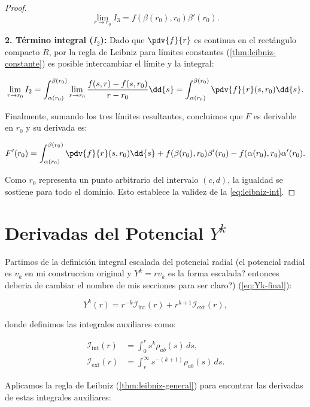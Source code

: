 \begin{proof}
  \[ \lim_{r\to r_0} I_3 = f(\beta(r_0),r_0)\beta'(r_0). \]

  \textbf{2. Término integral (\( I_2 \)):} Dado que \( \pdv{f}{r} \) es continua en el rectángulo compacto \( R \), por la regla de Leibniz para límites constantes (\cref{thm:leibniz-constante}) es posible intercambiar el límite y la integral:

  \[ \lim_{r \to r_0} I_2 = \int_{\alpha(r_0)}^{\beta(r_0)} \lim_{r\to r_0} \frac{f(s,r) - f(s,r_0)}{r-r_0} \dd{s} = \int_{\alpha(r_0)}^{\beta(r_0)} \pdv{f}{r}(s,r_0) \dd{s}. \]

  Finalmente, sumando los tres límites resultantes, concluimos que \( F \) es derivable en \( r_0 \) y su derivada es:

  \[ F'(r_0) = \int_{\alpha(r_0)}^{\beta(r_0)} \pdv{f}{r}(s,r_0) \dd{s} + f(\beta(r_0),r_0) \beta'(r_0) - f(\alpha(r_0), r_0) \alpha'(r_0). \]

  Como \( r_0 \) representa un punto arbitrario del intervalo \( (c,d) \), la igualdad se sostiene para todo el dominio. Esto establece la validez de la \cref{eq:leibniz-int}.

\end{proof}

\section{Derivadas del Potencial $Y^k$}

Partimos de la definición integral escalada del potencial radial (el potencial radial es \( v_k \) en mi construccion original y \( Y^k = rv_k \) es la forma escalada? entonces deberia de cambiar el nombre de mis secciones para ser claro?) (\cref{eq:Yk-final}):

\begin{equation}
    Y^k(r) = r^{-k} \mathcal{I}_{\text{int}}(r) + r^{k+1} \mathcal{I}_{\text{ext}}(r),
\end{equation}

donde definimos las integrales auxiliares como:

\begin{align}
    \mathcal{I}_{\text{int}}(r) &= \int_{0}^{r} s^k \rho_{ab}(s) \, ds, \\
    \mathcal{I}_{\text{ext}}(r) &= \int_{r}^{\infty} s^{-(k+1)} \rho_{ab}(s) \, ds.
\end{align}

Aplicamos la regla de Leibniz (\cref{thm:leibniz-general}) para encontrar las derivadas de estas integrales auxiliares:

